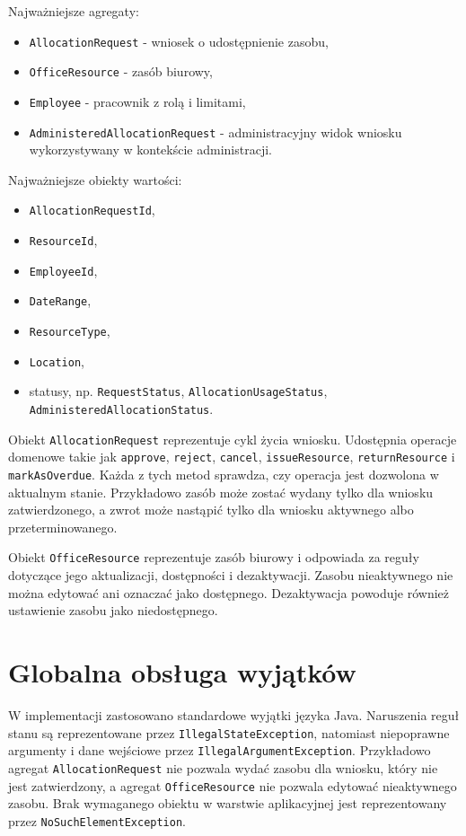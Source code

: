 Najważniejsze agregaty:
\begin{itemize}
    \item \texttt{AllocationRequest} - wniosek o udostępnienie zasobu,
    \item \texttt{OfficeResource} - zasób biurowy,
    \item \texttt{Employee} - pracownik z rolą i limitami,
    \item \texttt{AdministeredAllocationRequest} - administracyjny widok wniosku wykorzystywany w kontekście administracji.
\end{itemize}

Najważniejsze obiekty wartości:
\begin{itemize}
    \item \texttt{AllocationRequestId},
    \item \texttt{ResourceId},
    \item \texttt{EmployeeId},
    \item \texttt{DateRange},
    \item \texttt{ResourceType},
    \item \texttt{Location},
    \item statusy, np. \texttt{RequestStatus}, \texttt{AllocationUsageStatus}, \texttt{AdministeredAllocationStatus}.
\end{itemize}

Obiekt \texttt{AllocationRequest} reprezentuje cykl życia wniosku. Udostępnia operacje domenowe takie jak \texttt{approve}, \texttt{reject}, \texttt{cancel}, \texttt{issueResource}, \texttt{returnResource} i \texttt{markAsOverdue}. Każda z tych metod sprawdza, czy operacja jest dozwolona w aktualnym stanie. Przykładowo zasób może zostać wydany tylko dla wniosku zatwierdzonego, a zwrot może nastąpić tylko dla wniosku aktywnego albo przeterminowanego.

Obiekt \texttt{OfficeResource} reprezentuje zasób biurowy i odpowiada za reguły dotyczące jego aktualizacji, dostępności i dezaktywacji. Zasobu nieaktywnego nie można edytować ani oznaczać jako dostępnego. Dezaktywacja powoduje również ustawienie zasobu jako niedostępnego.

\section{Globalna obsługa wyjątków}

W implementacji zastosowano standardowe wyjątki języka Java. Naruszenia reguł stanu są reprezentowane przez \texttt{IllegalStateException}, natomiast niepoprawne argumenty i dane wejściowe przez \texttt{IllegalArgumentException}. Przykładowo agregat \texttt{AllocationRequest} nie pozwala wydać zasobu dla wniosku, który nie jest zatwierdzony, a agregat \texttt{OfficeResource} nie pozwala edytować nieaktywnego zasobu. Brak wymaganego obiektu w warstwie aplikacyjnej jest reprezentowany przez \texttt{NoSuchElementException}.

